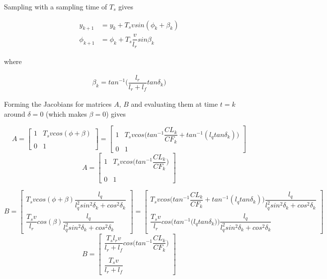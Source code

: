\documentclass[oneside,12pt]{article}
\begin{document}
    Sampling with a sampling time of $T_s$ gives

    \begin{align}
      y_{k+1} &= y_{k} + T_s v sin(\phi_k + \beta_k) \\
      \phi_{k+1} &= \phi_{k} + T_s \dfrac{v}{l_r} sin\beta_k
    \end{align}

    where

    \begin{align}
      \beta_k = tan^{-1}\Big(\dfrac{l_r}{l_r + l_f} tan\delta_k\Big)
    \end{align}


    Forming the Jacobians for matrices $A$, $B$ and evaluating them at time
    $t=k$ around $\delta = 0$ (which makes $\beta = 0$) gives

    \begin{equation}
     A =
      \begin{bmatrix}
        1 & T_s v cos(\phi + \beta) \\\\
        0 & 1
      \end{bmatrix}
      =
      \begin{bmatrix}
        1 & T_s v cos\Big(tan^{-1}\dfrac{CL_k}{CF_k} + tan^{-1} (l_q tan\delta_k)\Big) \\
        0 & 1
      \end{bmatrix}
    \end{equation}
    \begin{equation}
     A =
      \begin{bmatrix}
        1 & T_s v cos\Big(tan^{-1}\dfrac{CL_k}{CF_k}\Big) \\\\
        0 & 1
      \end{bmatrix}
    \end{equation}

    \begin{equation}
     B =
      \begin{bmatrix}
        T_s v cos(\phi + \beta) \dfrac{l_q}{l_q^2 sin^2\delta_k + cos^2\delta_k} \\
        \dfrac{T_s v}{l_r} cos(\beta) \dfrac{l_q}{l_q^2 sin^2\delta_k + cos^2\delta_k}
      \end{bmatrix}
      =
      \begin{bmatrix}
        T_s v cos\Big(tan^{-1}\dfrac{CL_k}{CF_k} + tan^{-1} (l_q tan\delta_k)\Big) \dfrac{l_q}{l_q^2 sin^2\delta_k + cos^2\delta_k} \\
        \dfrac{T_s v}{l_r} cos\Bigg(tan^{-1} \Big(l_q tan\delta_k\Big)\Bigg) \dfrac{l_q}{l_q^2 sin^2\delta_k + cos^2\delta_k}
      \end{bmatrix}
    \end{equation}
    \begin{equation}
     B =
      \begin{bmatrix}
        \dfrac{T_s l_r v}{l_r + l_f} cos\Big(tan^{-1}\dfrac{CL_k}{CF_k}\Big) \\\\
        \dfrac{T_s v}{l_r+l_f}
      \end{bmatrix}
    \end{equation}
\end{document}
